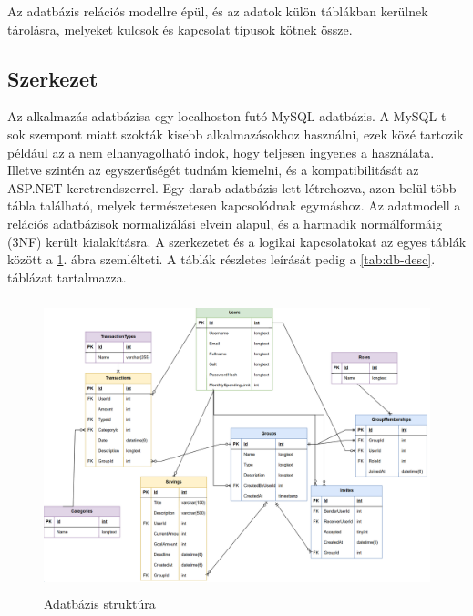 Az adatbázis relációs modellre épül, és az adatok külön táblákban kerülnek tárolásra, melyeket kulcsok és kapcsolat típusok kötnek össze.

\subsection{Szerkezet}
Az alkalmazás adatbázisa egy localhoston futó MySQL adatbázis.
A MySQL-t sok szempont miatt szokták kisebb alkalmazásokhoz
használni, ezek közé tartozik például az a nem elhanyagolható
indok, hogy teljesen ingyenes a használata. Illetve szintén
az egyszerűségét tudnám kiemelni, és a kompatibilitását az ASP.NET keretrendszerrel. Egy darab adatbázis lett létrehozva, azon belül több tábla található, melyek természetesen kapcsolódnak egymáshoz. Az adatmodell a relációs adatbázisok normalizálási elvein alapul, és a harmadik normálformáig (3NF) került kialakításra.
A szerkezetet és a logikai kapcsolatokat az egyes táblák között a \ref{fig:database-structure}. ábra szemlélteti. A táblák részletes leírását pedig a \ref{tab:db-desc}. táblázat tartalmazza.

\begin{figure}[H]
	\centering
	\includegraphics[height=320px]{img/0000}
	\caption{Adatbázis struktúra}
	\label{fig:database-structure}
\end{figure}

